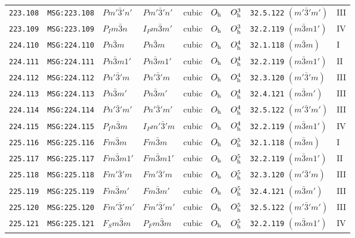 \documentclass[fleqn,10pt]{jsarticle}
\begin{document}
\begin{center}
\begin{longtable}{lllllllll}
\texttt{223.108} & \texttt{MSG:223.108} & $Pm'\bar{3}'n'$ & $Pm'\bar{3}'n'$ & cubic & $O_{\rm h}$ & $O_{\rm h}^{3}$ & \texttt{32.5.122} $(m'\bar{3}'m')$ & III \\
\texttt{223.109} & \texttt{MSG:223.109} & $P_{I}m\bar{3}n$ & $I_{P}m\bar{3}m'$ & cubic & $O_{\rm h}$ & $O_{\rm h}^{3}$ & \texttt{32.2.119} $(m\bar{3}m1')$ & IV \\ \hline
\texttt{224.110} & \texttt{MSG:224.110} & $Pn\bar{3}m$ & $Pn\bar{3}m$ & cubic & $O_{\rm h}$ & $O_{\rm h}^{4}$ & \texttt{32.1.118} $(m\bar{3}m)$ & I \\
\texttt{224.111} & \texttt{MSG:224.111} & $Pn\bar{3}m1'$ & $Pn\bar{3}m1'$ & cubic & $O_{\rm h}$ & $O_{\rm h}^{4}$ & \texttt{32.2.119} $(m\bar{3}m1')$ & II \\
\texttt{224.112} & \texttt{MSG:224.112} & $Pn'\bar{3}'m$ & $Pn'\bar{3}'m$ & cubic & $O_{\rm h}$ & $O_{\rm h}^{4}$ & \texttt{32.3.120} $(m'\bar{3}'m)$ & III \\
\texttt{224.113} & \texttt{MSG:224.113} & $Pn\bar{3}m'$ & $Pn\bar{3}m'$ & cubic & $O_{\rm h}$ & $O_{\rm h}^{4}$ & \texttt{32.4.121} $(m\bar{3}m')$ & III \\
\texttt{224.114} & \texttt{MSG:224.114} & $Pn'\bar{3}'m'$ & $Pn'\bar{3}'m'$ & cubic & $O_{\rm h}$ & $O_{\rm h}^{4}$ & \texttt{32.5.122} $(m'\bar{3}'m')$ & III \\
\texttt{224.115} & \texttt{MSG:224.115} & $P_{I}n\bar{3}m$ & $I_{P}m'\bar{3}'m$ & cubic & $O_{\rm h}$ & $O_{\rm h}^{4}$ & \texttt{32.2.119} $(m\bar{3}m1')$ & IV \\ \hline
\texttt{225.116} & \texttt{MSG:225.116} & $Fm\bar{3}m$ & $Fm\bar{3}m$ & cubic & $O_{\rm h}$ & $O_{\rm h}^{5}$ & \texttt{32.1.118} $(m\bar{3}m)$ & I \\
\texttt{225.117} & \texttt{MSG:225.117} & $Fm\bar{3}m1'$ & $Fm\bar{3}m1'$ & cubic & $O_{\rm h}$ & $O_{\rm h}^{5}$ & \texttt{32.2.119} $(m\bar{3}m1')$ & II \\
\texttt{225.118} & \texttt{MSG:225.118} & $Fm'\bar{3}'m$ & $Fm'\bar{3}'m$ & cubic & $O_{\rm h}$ & $O_{\rm h}^{5}$ & \texttt{32.3.120} $(m'\bar{3}'m)$ & III \\
\texttt{225.119} & \texttt{MSG:225.119} & $Fm\bar{3}m'$ & $Fm\bar{3}m'$ & cubic & $O_{\rm h}$ & $O_{\rm h}^{5}$ & \texttt{32.4.121} $(m\bar{3}m')$ & III \\
\texttt{225.120} & \texttt{MSG:225.120} & $Fm'\bar{3}'m'$ & $Fm'\bar{3}'m'$ & cubic & $O_{\rm h}$ & $O_{\rm h}^{5}$ & \texttt{32.5.122} $(m'\bar{3}'m')$ & III \\
\texttt{225.121} & \texttt{MSG:225.121} & $F_{S}m\bar{3}m$ & $P_{F}m\bar{3}m$ & cubic & $O_{\rm h}$ & $O_{\rm h}^{5}$ & \texttt{32.2.119} $(m\bar{3}m1')$ & IV \\ \hline

\end{longtable}
\end{center}
\end{document}
